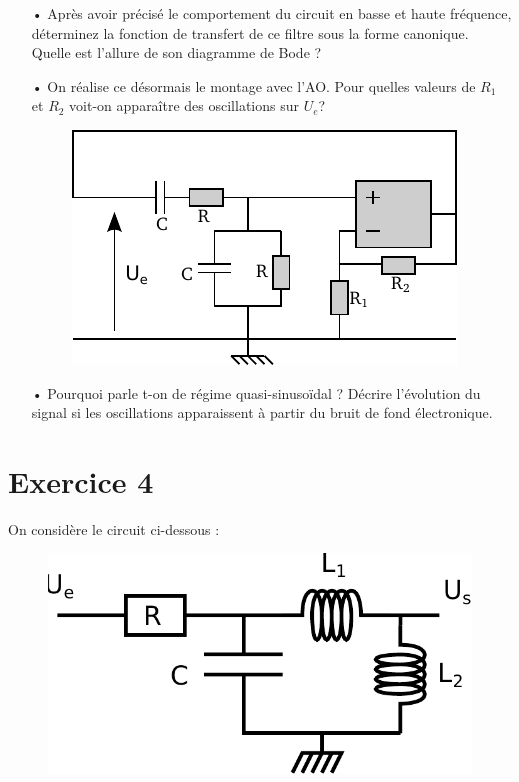 \documentclass{report}
\begin{document}
\begin{itemize}
	\item[•] Après avoir précisé le comportement du circuit en basse et haute fréquence, déterminez la fonction de transfert de ce filtre sous la forme canonique. Quelle est l'allure de son diagramme de Bode ?
	\item[•] On réalise ce désormais le montage avec l'AO. Pour quelles valeurs de $R_1$ et $R_2$ voit-on apparaître des oscillations sur $U_{e}$?
\begin{figure}[!h]
\centering
\includegraphics[width=0.6\linewidth]{circuit_4.pdf}
\end{figure}

	\item[•] Pourquoi parle t-on de régime quasi-sinusoïdal ? Décrire l'évolution du signal si les oscillations apparaissent à partir du bruit de fond électronique.
\end{itemize}


\newpage

\section*{Exercice 4}

On considère le circuit ci-dessous :

\begin{figure}[!h]
\centering
\includegraphics[width=0.4\linewidth]{resonnateur.pdf}
\end{figure}
\end{document}
